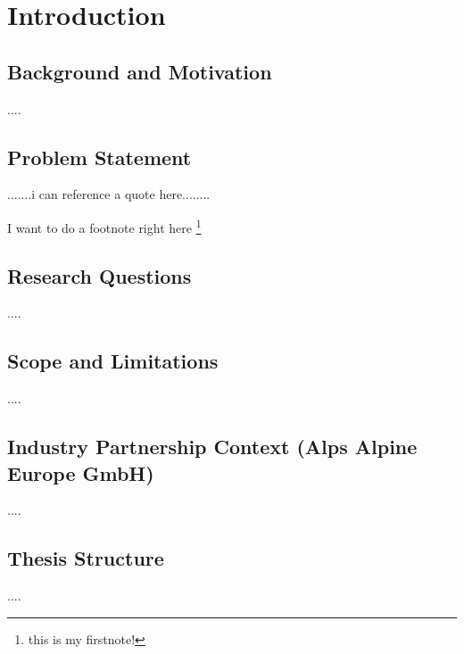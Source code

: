 \chapter{Introduction}

\section{Background and Motivation}
....


\section{Problem Statement}
.......i can reference a quote here........ \cite{knuth:1984}

I want to do a footnote right here \footnote{this is my firstnote!}

\section{Research Questions}
....

\section{Scope and Limitations}
....

\section{Industry Partnership Context (Alps Alpine Europe GmbH)}
....

\section{Thesis Structure}
....